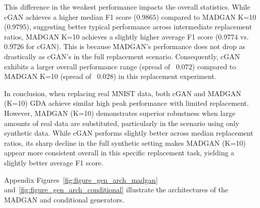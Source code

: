 This difference in the weakest performance impacts the overall statistics. While cGAN achieves a higher median F1 score ($0.9865$) compared to MADGAN K=10 ($0.9795$), suggesting better typical performance across intermediate replacement ratios, MADGAN K=10 achieves a slightly higher average F1 score ($0.9774$ vs. $0.9726$ for cGAN). This is because MADGAN's performance does not drop as drastically as cGAN's in the full replacement scenario. Consequently, cGAN exhibits a larger overall performance range (spread of ~$0.072$) compared to MADGAN K=10 (spread of ~$0.028$) in this replacement experiment.

In conclusion, when replacing real MNIST data, both cGAN and MADGAN (K=10) GDA achieve similar high peak performance with limited replacement. However, MADGAN (K=10) demonstrates superior robustness when large amounts of real data are substituted, particularly in the scenario using only synthetic data. While cGAN performs slightly better across median replacement ratios, its sharp decline in the full synthetic setting makes MADGAN (K=10) appear more consistent overall in this specific replacement task, yielding a slightly better average F1 score.

Appendix Figures~\ref{fig:figure_gen_arch_madgan} and~\ref{fig:figure_gen_arch_conditional} illustrate the architectures of the MADGAN and conditional generators.

